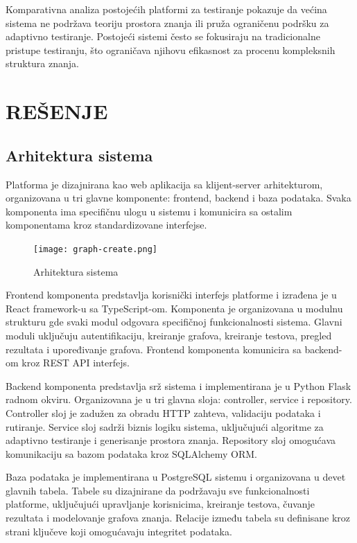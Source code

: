 \documentclass[conference]{IEEEtran}
\begin{document}
Komparativna analiza postojećih platformi za testiranje pokazuje da većina sistema ne podržava teoriju prostora znanja ili pruža ograničenu podršku za adaptivno testiranje. Postojeći sistemi često se fokusiraju na tradicionalne pristupe testiranju, što ograničava njihovu efikasnost za procenu kompleksnih struktura znanja.

\section{REŠENJE}

\subsection{Arhitektura sistema}

Platforma je dizajnirana kao web aplikacija sa klijent-server arhitekturom, organizovana u tri glavne komponente: frontend, backend i baza podataka. Svaka komponenta ima specifičnu ulogu u sistemu i komunicira sa ostalim komponentama kroz standardizovane interfejse.

\begin{figure}[H]
\centering
\texttt{[image: graph-create.png]}
\caption{Arhitektura sistema}
\end{figure}

Frontend komponenta predstavlja korisnički interfejs platforme i izrađena je u React framework-u sa TypeScript-om. Komponenta je organizovana u modulnu strukturu gde svaki modul odgovara specifičnoj funkcionalnosti sistema. Glavni moduli uključuju autentifikaciju, kreiranje grafova, kreiranje testova, pregled rezultata i upoređivanje grafova. Frontend komponenta komunicira sa backend-om kroz REST API interfejs.

Backend komponenta predstavlja srž sistema i implementirana je u Python Flask radnom okviru. Organizovana je u tri glavna sloja: controller, service i repository. Controller sloj je zadužen za obradu HTTP zahteva, validaciju podataka i rutiranje. Service sloj sadrži biznis logiku sistema, uključujući algoritme za adaptivno testiranje i generisanje prostora znanja. Repository sloj omogućava komunikaciju sa bazom podataka kroz SQLAlchemy ORM.

Baza podataka je implementirana u PostgreSQL sistemu i organizovana u devet glavnih tabela. Tabele su dizajnirane da podržavaju sve funkcionalnosti platforme, uključujući upravljanje korisnicima, kreiranje testova, čuvanje rezultata i modelovanje grafova znanja. Relacije između tabela su definisane kroz strani ključeve koji omogućavaju integritet podataka.
\end{document}
